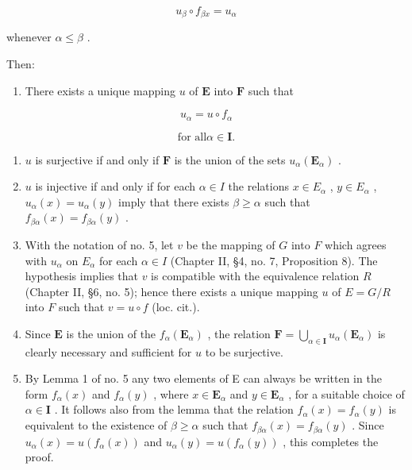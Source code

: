 \[
u _ {\beta} \circ f _ {\beta x} = u _ {\alpha}\tag{23}
\]

whenever \(\alpha \leqslant \beta\) .

Then:

\begin{enumerate}
\def\labelenumi{(\alph{enumi})}
\tightlist
\item
  There exists a unique mapping \(u\) of \(\mathbf{E}\) into \(\mathbf{F}\) such that
\end{enumerate}

\[
u _ {\alpha} = u \circ f _ {\alpha}\tag{24}
\]

\[
{\text{for all}} \alpha \in \mathbf {I}.
\]

\begin{enumerate}
\def\labelenumi{(\alph{enumi})}
\setcounter{enumi}{1}
\item
  \(u\) is surjective if and only if \(\mathbf{F}\) is the union of the sets \(u_{\alpha}(\mathbf{E}_{\alpha})\) .
\item
  \(u\) is injective if and only if for each \(\alpha \in I\) the relations \(x \in E_{\alpha}\) , \(y \in E_{\alpha}\) , \(u_{\alpha}(x) = u_{\alpha}(y)\) imply that there exists \(\beta \geqslant \alpha\) such that \(f_{\beta \alpha}(x) = f_{\beta \alpha}(y)\) .
\item
  With the notation of no. 5, let \(v\) be the mapping of \(G\) into \(F\) which agrees with \(u_{\alpha}\) on \(E_{\alpha}\) for each \(\alpha \in I\) (Chapter II, §4, no. 7, Proposition 8). The hypothesis implies that \(v\) is compatible with the equivalence relation \(R\) (Chapter II, §6, no. 5); hence there exists a unique mapping \(u\) of \(E = G / R\) into \(F\) such that \(v = u \circ f\) (loc. cit.).
\item
  Since \(\mathbf{E}\) is the union of the \(f_{\alpha}(\mathbf{E}_{\alpha})\) , the relation \(\mathbf{F} = \bigcup_{\alpha \in \mathbf{I}} u_{\alpha}(\mathbf{E}_{\alpha})\) is clearly necessary and sufficient for \(u\) to be surjective.
\item
  By Lemma 1 of no. 5 any two elements of E can always be written in the form \(f_{\alpha}(x)\) and \(f_{\alpha}(y)\) , where \(x \in \mathbf{E}_{\alpha}\) and \(y \in \mathbf{E}_{\alpha}\) , for a suitable choice of \(\alpha \in \mathbf{I}\) . It follows also from the lemma that the relation \(f_{\alpha}(x) = f_{\alpha}(y)\) is equivalent to the existence of \(\beta \geqslant \alpha\) such that \(f_{\beta \alpha}(x) = f_{\beta \alpha}(y)\) . Since \(u_{\alpha}(x) = u(f_{\alpha}(x))\) and \(u_{\alpha}(y) = u(f_{\alpha}(y))\) , this completes the proof.
\end{enumerate}

